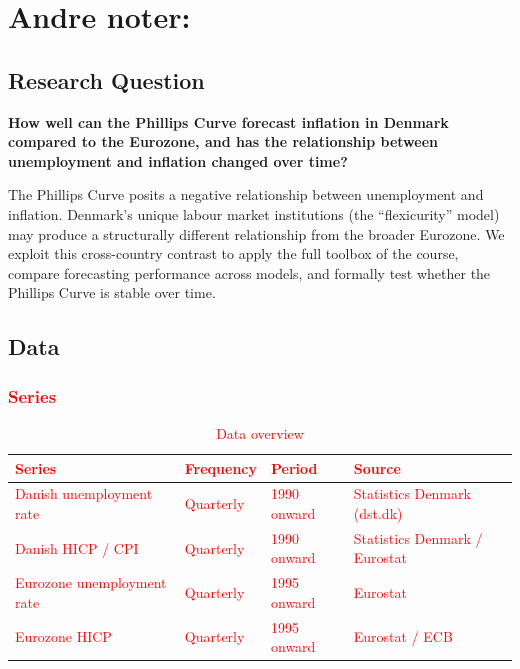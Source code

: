 
\chapter{Andre noter:}
\section{Research Question}

\textbf{How well can the Phillips Curve forecast inflation in Denmark compared
to the Eurozone, and has the relationship between unemployment and inflation
changed over time?}

The Phillips Curve posits a negative relationship between unemployment and
inflation. Denmark's unique labour market institutions (the ``flexicurity''
model) may produce a structurally different relationship from the broader
Eurozone. We exploit this cross-country contrast to apply the full toolbox
of the course, compare forecasting performance across models, and formally
test whether the Phillips Curve is stable over time.

\section{Data}



\textcolor{red}{
\subsection{Series}

\begin{table}[h!]
\centering
\begin{tabular}{llll}
\toprule
\textbf{Series} & \textbf{Frequency} & \textbf{Period} & \textbf{Source} \\
\midrule
Danish unemployment rate & Quarterly & 1990 onward & Statistics Denmark (dst.dk) \\
Danish HICP / CPI & Quarterly & 1990 onward & Statistics Denmark / Eurostat \\
Eurozone unemployment rate & Quarterly & 1995 onward & Eurostat \\
Eurozone HICP & Quarterly & 1995 onward & Eurostat / ECB \\
\bottomrule
\end{tabular}
\caption{Data overview}
\end{table}
}

